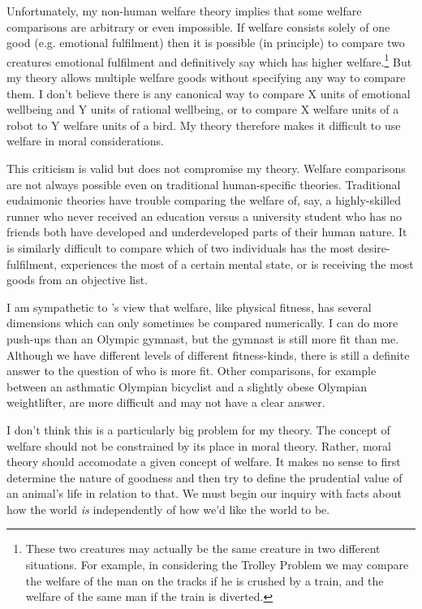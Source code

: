 \documentclass{article}
\begin{document}
Unfortunately, my non-human welfare theory implies that some welfare comparisons are arbitrary or even impossible. If welfare consists solely of one good (e.g. emotional fulfilment) then it is possible (in principle) to compare two creatures emotional fulfilment and definitively say which has higher welfare.\footnote{These two creatures may actually be the same creature in two different situations. For example, in considering the Trolley Problem we may compare the welfare of the man on the tracks if he is crushed by a train, and the welfare of the same man if the train is diverted.} But my theory allows multiple welfare goods without specifying any way to compare them. I don't believe there is any canonical way to compare X units of emotional wellbeing and Y units of rational wellbeing, or to compare X welfare units of a robot to Y welfare units of a bird. My theory therefore makes it difficult to use welfare in moral considerations.

This criticism is valid but does not compromise my theory. Welfare comparisons are not always possible even on traditional human-specific theories. Traditional eudaimonic theories have trouble comparing the welfare of, say, a highly-skilled runner who never received an education versus a university student who has no friends \textemdash{} both have developed and underdeveloped parts of their human nature. It is similarly difficult to compare which of two individuals has the most desire-fulfilment, experiences the most of a certain mental state, or is receiving the most goods from an objective list. 

I am sympathetic to \citet{keller2009welfare}'s view that welfare, like physical fitness, has several dimensions which can only sometimes be compared numerically. I can do more push-ups than an Olympic gymnast, but the gymnast is still more fit than me. Although we have different levels of different fitness-kinds, there is still a definite answer to the question of who is more fit. Other comparisons, for example between an asthmatic Olympian bicyclist and a slightly obese Olympian weightlifter, are more difficult and may not have a clear answer.

I don't think this is a particularly big problem for my theory. The concept of welfare should not be constrained by its place in moral theory. Rather, moral theory should accomodate a given concept of welfare. It makes no sense to first determine the nature of goodness and then try to define the prudential value of an animal's life in relation to that. We must begin our inquiry with facts about how the world \textit{is} independently of how we'd like the world to be.
\end{document}
